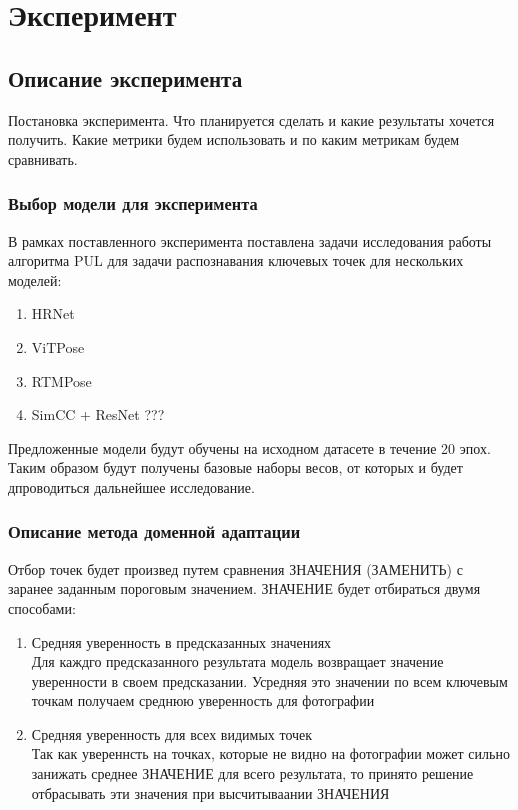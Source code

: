\section{Эксперимент}
\label{sec:Chapter5} 

\subsection{Описание эксперимента}

Постановка эксперимента. Что планируется сделать и какие результаты хочется получить. Какие метрики будем использовать и по каким метрикам будем сравнивать.

\subsubsection*{Выбор модели для эксперимента}

В рамках поставленного эксперимента поставлена задачи исследования работы алгоритма PUL для задачи распознавания ключевых точек для нескольких моделей:
\begin{enumerate}
\item HRNet
\item ViTPose
\item RTMPose
\item SimCC + ResNet ???
\end{enumerate}

Предложенные модели будут обучены на исходном датасете в течение 20 эпох. Таким образом будут получены базовые наборы весов, от которых и будет дпроводиться дальнейшее исследование.

\subsubsection*{Описание метода доменной адаптации}
Отбор точек будет произвед путем сравнения ЗНАЧЕНИЯ (ЗАМЕНИТЬ) с заранее заданным пороговым значением. ЗНАЧЕНИЕ будет отбираться двумя способами:
\begin{enumerate}
\item Средняя уверенность в предсказанных значениях\\
Для каждго предсказанного результата модель возвращает значение уверенности в своем предсказании. Усредняя это значении по всем ключевым точкам получаем среднюю уверенность для фотографии
\item Средняя уверенность для всех видимых точек\\
Так как увереннсть на точках, которые не видно на фотографии может сильно занижать среднее ЗНАЧЕНИЕ для всего результата, то принято решение отбрасывать эти значения при высчитываании ЗНАЧЕНИЯ
\end{enumerate}

